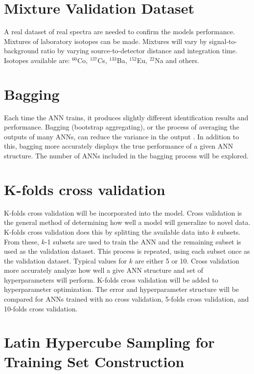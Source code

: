 \documentclass[thesis,tocnosub,noragright,centerchapter,12pt,fullpage]{uiucecethesis09}
\begin{document}
\section{Mixture Validation Dataset}

A real dataset of real spectra are needed to confirm the models performance. Mixtures of laboratory isotopes can be made. Mixtures will vary by signal-to-background ratio by varying source-to-detector distance and integration time. Isotopes available are: $^{60}$Co, $^{137}$Cs, $^{133}$Ba, $^{152}$Eu, $^{22}$Na and others. %


\section{Bagging}
Each time the ANN trains, it produces slightly different identification results and performance. Bagging (bootstrap aggregating), or the process of averaging the outputs of many ANNs, can reduce the variance in the output \cite{Breiman1996}. In addition to this, bagging more accurately displays the true performance of a given ANN structure. The number of ANNs included in the bagging process will be explored.

\section{K-folds cross validation}
K-folds cross validation will be incorporated into the model. Cross validation is the general method of determining how well a model will generalize to novel data. K-folds cross validation does this by splitting the available data into $k$ subsets. From these, $k$-1 subsets are used to train the ANN and the remaining subset is used as the validation dataset. This process is repeated, using each subset once as the validation dataset. Typical values for $k$ are either 5 or 10. Cross validation more accurately analyze how well a give ANN structure and set of hyperparameters will perform. K-folds cross validation will be added to hyperparameter optimization. The error and hyperparameter structure will be compared for ANNs trained with no cross validation, 5-folds cross validation, and 10-folds cross validation.


\section{Latin Hypercube Sampling for Training Set Construction}

\end{document}
